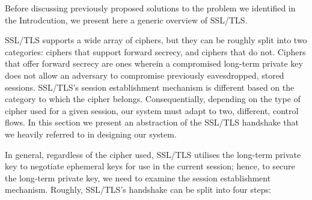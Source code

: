 \documentclass[../main.tex]{subfiles}
\begin{document}
\label{sec:ssloverview}
Before discussing previously proposed solutions to the problem we
identified in the Introdcution, we present here a generic overview of
SSL/TLS.

SSL/TLS supports a wide array of ciphers, but they can be roughly
split into two categories: ciphers that support forward secrecy, and
ciphers that do not. Ciphers that offer forward secrecy are ones
wherein a compromised long-term private key does not allow an
adversary to compromise previously eavesdropped, stored
sessions. SSL/TLS's session establishment mechanism is different based
on the category to which the cipher belongs. Consequentially,
depending on the type of cipher used for a given session, our system
must adapt to two, different, control flows. In this section we present
an abstraction of the SSL/TLS handshake that we heavily referred
to in designing our system.

In general, regardless of the cipher used, SSL/TLS utilises
the long-term private key to negotiate ephemeral keys for use in the
current session; hence, to secure the long-term private key, we need
to examine the session establishment mechanism. Roughly, SSL/TLS's
handshake can be split into four steps:
\end{document}
